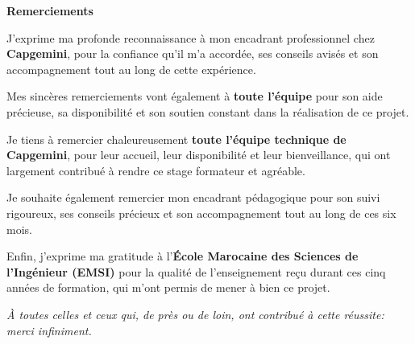 \documentclass[12pt,a4paper]{report}
\begin{document}
\clearpage

\cleardoublepage
{} %
\setcounter{page}{1}
\vspace*{1.5cm}

\begin{center}
    {\Large\bfseries Remerciements}\par
    \vspace{1.2cm}

    \begin{minipage}{0.85\linewidth}
    \centering
    J'exprime ma profonde reconnaissance à mon encadrant professionnel chez \textbf{Capgemini}, pour la confiance qu'il m'a accordée, ses conseils avisés et son accompagnement tout au long de cette expérience.\par
    \vspace{0.8em}

    Mes sincères remerciements vont également à \textbf{toute l'équipe} pour son aide précieuse, sa disponibilité et son soutien constant dans la réalisation de ce projet.\par
    \vspace{0.8em}

    Je tiens à remercier chaleureusement \textbf{toute l'équipe technique de Capgemini}, pour leur accueil, leur disponibilité et leur bienveillance, qui ont largement contribué à rendre ce stage formateur et agréable.\par
    \vspace{0.8em}

    Je souhaite également remercier mon encadrant pédagogique pour son suivi rigoureux, ses conseils précieux et son accompagnement tout au long de ces six mois.\par
    \vspace{0.8em}

    Enfin, j'exprime ma gratitude à l'\textbf{École Marocaine des Sciences de l'Ingénieur (EMSI)} pour la qualité de l'enseignement reçu durant ces cinq années de formation, qui m'ont permis de mener à bien ce projet.\par

    \vspace{1.2em}
    \emph{À toutes celles et ceux qui, de près ou de loin, ont contribué à cette réussite: merci infiniment.}
    \end{minipage}
\end{center}
\clearpage
\end{document}
